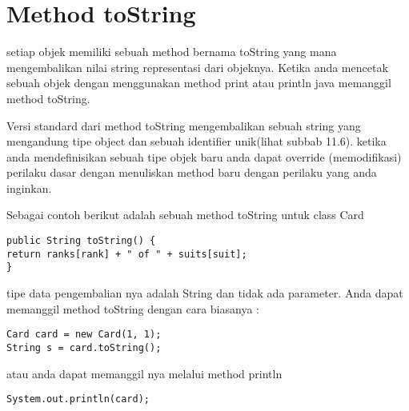 \section{Method toString} %

setiap objek memiliki sebuah method bernama toString yang mana mengembalikan nilai string representasi dari objeknya. Ketika anda mencetak sebuah objek dengan menggunakan method print atau println java memanggil method toString.

Versi standard dari method toString mengembalikan sebuah string yang mengandung tipe object dan sebuah identifier unik(lihat subbab 11.6). ketika anda mendefinisikan sebuah tipe objek baru anda dapat override (memodifikasi) perilaku dasar dengan menuliskan method baru dengan perilaku yang anda inginkan.

Sebagai contoh berikut adalah sebuah method toString untuk class Card
\begin{lstlisting}
public String toString() {
return ranks[rank] + " of " + suits[suit];
}
\end{lstlisting}

tipe data pengembalian nya adalah String dan tidak ada parameter. Anda dapat memanggil method toString dengan cara biasanya :

\begin{lstlisting}
Card card = new Card(1, 1);
String s = card.toString();
\end{lstlisting}

atau anda dapat memanggil nya melalui method println 
\begin{lstlisting}
System.out.println(card);
\end{lstlisting}
